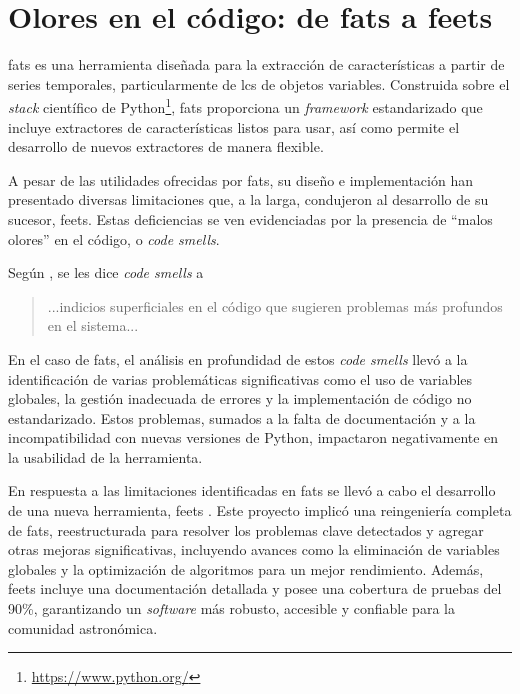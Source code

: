 \section[Olores en el código: de FATS a feets]{
    Olores en el código: de \acrshort{fats} a \acrshort{feets}
}


\gls{fats} \citep{nun2015fatsfeatureanalysistime} es una herramienta diseñada para la extracción de características a partir de series temporales, particularmente de \glspl{lc} de objetos variables. Construida sobre el \emph{stack} científico de Python\footnote{\url{https://www.python.org/}}, \gls{fats} proporciona un \emph{framework} estandarizado que incluye extractores de características listos para usar, así como permite el desarrollo de nuevos extractores de manera flexible.

A pesar de las utilidades ofrecidas por \gls{fats}, su diseño e implementación han presentado diversas limitaciones que, a la larga, condujeron al desarrollo de su sucesor, \gls{feets}. Estas deficiencias se ven evidenciadas por la presencia de ``malos olores'' en el código, o \emph{code smells}.

Según \citet{fowler2006codesmell}, se les dice \emph{code smells} a
\begin{quote}
    ...indicios superficiales en el código que sugieren problemas más profundos en el sistema...
\end{quote}

En el caso de \gls{fats}, el análisis en profundidad de estos \emph{code smells} \citep{cabral2018fatsfeetsimprovementsastronomical} llevó a la identificación de varias problemáticas significativas como el uso de variables globales, la gestión inadecuada de errores y la implementación de código no estandarizado. Estos problemas, sumados a la falta de documentación y a la incompatibilidad con nuevas versiones de Python, impactaron negativamente en la usabilidad de la herramienta.

En respuesta a las limitaciones identificadas en \gls{fats} se llevó a cabo el desarrollo de una nueva herramienta, \acrfull{feets} \citep{cabral2018feets}. Este proyecto implicó una reingeniería completa de \gls{fats}, reestructurada para resolver los problemas clave detectados y agregar otras mejoras significativas, incluyendo avances como la eliminación de variables globales y la optimización de algoritmos para un mejor rendimiento. Además, \gls{feets} incluye una documentación detallada y posee una cobertura de pruebas del 90\%, garantizando un \emph{software} más robusto, accesible y confiable para la comunidad astronómica.

